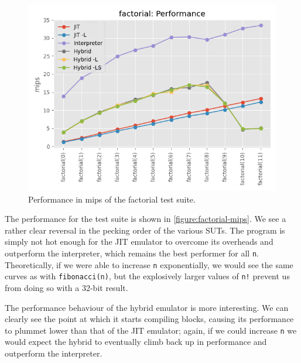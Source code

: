 \begin{figure}[H]
    \centering
    \includegraphics[scale=0.75]{output/graphs/tests/all/factorial/mips.png}
    \caption{Performance in mips of the factorial test suite.}
    \label{figure:factorial-mips}
\end{figure}

The performance for the test suite is shown in \autoref{figure:factorial-mips}. We see a rather clear reversal in the pecking order of the various SUTs. The program is simply not hot enough for the JIT emulator to overcome its overheads and outperform the interpreter, which remains the best performer for all \texttt{n}. Theoretically, if we were able to increase \texttt{n} exponentially, we would see the same curves as with \texttt{fibonacci(n)}, but the explosively larger values of \texttt{n!} prevent us from doing so with a 32-bit result.

The performance behaviour of the hybrid emulator is more interesting. We can clearly see the point at which it starts compiling blocks, causing its performance to plummet lower than that of the JIT emulator; again, if we could increase \texttt{n} we would expect the hybrid to eventually climb back up in performance and outperform the interpreter.